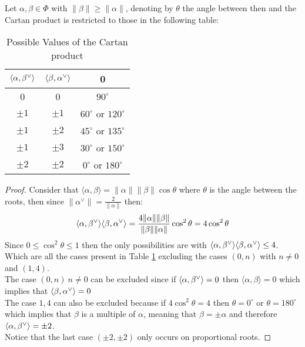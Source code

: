 \begin{prop}
	Let $\alpha,\beta \in \Phi$ with $\|\beta\|\ge \|\alpha\|$, denoting by $\theta$ the angle between then and the Cartan product is restricted to those in the following table:\\
	\begin{table}[ht]
		\caption{Possible Values of the Cartan product}
		\begin{center}
				\begin{tabular}{|c|c|c|}
					\hline
					$\langle {\alpha},{\beta}^\lor\rangle$ & $\langle {\beta},{\alpha}^\lor\rangle$ & 0 \\
					\hline
					0 & 0 & $90^\circ$\\
					$\pm 1$ & $\pm 1$  & $60^\circ$ or $120^\circ$ \\
					$\pm 1$ & $\pm 2$  & $45^\circ$ or $135^\circ$\\
					$\pm 1$ & $\pm 3$  & $30^\circ$ or $150^\circ$ \\
					$\pm 2$ & $\pm 2$  & $0^\circ$ or $180^\circ$\\
					\hline
				\end{tabular}
		\end{center}
		\label{Cartan}
	\end{table}
\end{prop}
\begin{proof}
	Consider that $\langle \alpha,\beta \rangle = \|\alpha\|\|\beta\|\cos\theta$ where $\theta$ is the angle between the roots, then since $\|\alpha^\lor\| = \frac{2}{\|\alpha\|}$ then:
	$$ \langle {\alpha},{\beta}^\lor\rangle\langle {\beta},{\alpha}^\lor\rangle= \frac{4\|\alpha\|\|\beta\|}{\|\beta\|\|\alpha\|}\cos^2\theta = 4 \cos^2 \theta$$ 
	Since $0\le \cos^2\theta \le 1$  then the only possibilities are with $\langle {\alpha},{\beta}^\lor\rangle\langle {\beta},{\alpha}^\lor\rangle\le 4$.\\
	Which are all the cases present in Table \ref{Cartan} excluding the cases $(0,n)$ with $n\not=0$ and $(1,4)$. \\
	The case $(0,n)\  n\not=0$ can be excluded since if $\langle {\alpha},{\beta}^\lor\rangle=0$ then $\langle \alpha,\beta \rangle = 0$ which implies that $\langle {\beta},{\alpha}^\lor\rangle = 0$\\
	The case $1,4$ can also be excluded because if $4\cos^2 \theta = 4$ then $\theta = 0^\circ$ or $\theta = 180^\circ$ which implies that $\beta$ is a multiple of $\alpha$, meaning that $\beta = \pm \alpha$ and therefore $\langle {\alpha},{\beta}^\lor\rangle = \pm2$.\\
	Notice that the last case $(\pm 2,\pm 2)$ only occurs on proportional roots.
\end{proof}
